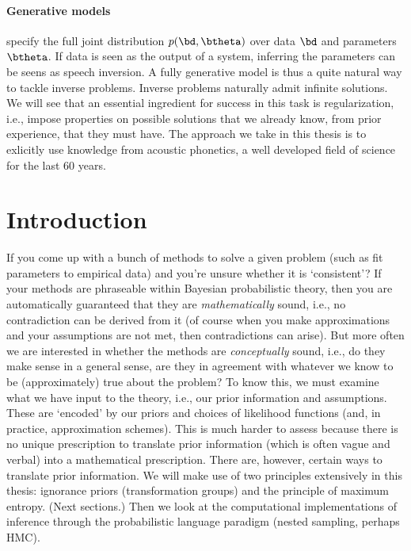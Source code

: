 \paragraph{Generative models} specify the full joint distribution $p(\bd,\btheta)$ over data $\bd$ and parameters $\btheta$.
If data is seen as the output of a system, inferring the parameters can be seens as speech inversion.
A fully generative model is thus a quite natural way to tackle inverse problems.
Inverse problems naturally admit infinite solutions.
We will see that an essential ingredient for success in this task is regularization, i.e., impose properties on possible solutions that we already know, from prior experience, that they must have.
The approach we take in this thesis is to exlicitly use knowledge from acoustic phonetics, a well developed field of science for the last 60 years.

\section{Introduction}

If you come up with a bunch of methods to solve a given problem (such as fit parameters to empirical data) and you're unsure whether it is `consistent'?
If your methods are phraseable within Bayesian probabilistic theory, then you are automatically guaranteed that they are \emph{mathematically} sound, i.e., no contradiction can be derived from it (of course when you make approximations and your assumptions are not met, then contradictions can arise).
But more often we are interested in whether the methods are \emph{conceptually} sound, i.e., do they make sense in a general sense, are they in agreement with whatever we know to be (approximately) true about the problem?
To know this, we must examine what we have input to the theory, i.e., our prior information and assumptions.
These are `encoded' by our priors and choices of likelihood functions (and, in practice, approximation schemes).
This is much harder to assess because there is no unique prescription to translate prior information (which is often vague and verbal) into a mathematical prescription.
There are, however, certain ways to translate prior information.
We will make use of two principles extensively in this thesis: ignorance priors (transformation groups) and the principle of maximum entropy.
(Next sections.)
Then we look at the computational implementations of inference through the probabilistic language paradigm (nested sampling, perhaps HMC).

